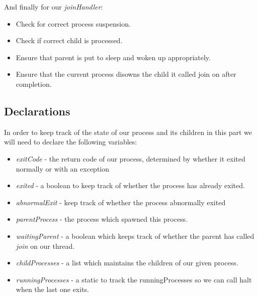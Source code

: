 \documentclass{article}
\begin{document}
And finally for our \textit{joinHandler}:
\begin{itemize}
\item Check for correct process suspension.
\item Check if correct child is processed.
\item Ensure that parent is put to sleep and woken up appropriately.
\item Ensure that the current process disowns the child it called join on after completion.
\end{itemize}

\subsection*{Declarations}

In order to keep track of the state of our process and its children in this part we will need to declare the following
variables:
\begin{itemize}
\item \textit{exitCode} - the return code of our process, determined by whether it exited normally or with an exception
\item \textit{exited} - a boolean to keep track of whether the process has already exited.
\item \textit{abnormalExit} - keep track of whether the process abnormally exited
\item \textit{parentProcess} - the process which spawned this process.
\item \textit{waitingParent} - a boolean which keeps track of whether the parent has called \textit{join} on our thread.
\item \textit{childProcesses} - a list which maintains the children of our given process.
\item \textit{runningProcesses} - a static to track the runningProcesses so we can call halt when the last one exits.
\end{itemize}
\end{document}
